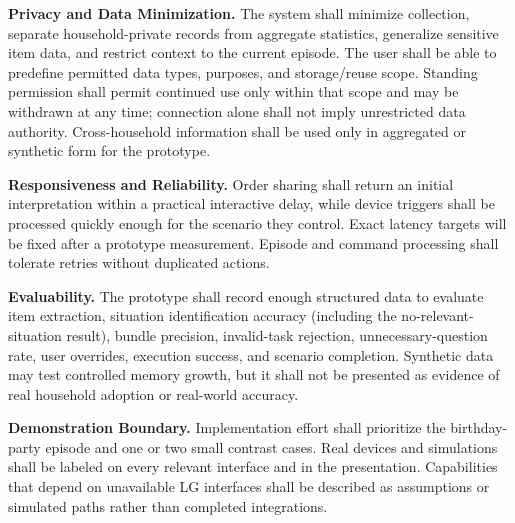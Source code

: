 \documentclass[conference]{IEEEtran}
\newcommand{\req}[1]{\par\addvspace{3pt}\noindent\textbf{#1}}
\begin{document}
\req{Privacy and Data Minimization.}
The system shall minimize collection, separate household-private records from aggregate statistics, generalize sensitive item data, and restrict context to the current episode. The user shall be able to predefine permitted data types, purposes, and storage/reuse scope. Standing permission shall permit continued use only within that scope and may be withdrawn at any time; connection alone shall not imply unrestricted data authority. Cross-household information shall be used only in aggregated or synthetic form for the prototype.

\req{Responsiveness and Reliability.}
Order sharing shall return an initial interpretation within a practical interactive delay, while device triggers shall be processed quickly enough for the scenario they control. Exact latency targets will be fixed after a prototype measurement. Episode and command processing shall tolerate retries without duplicated actions.

\req{Evaluability.}
The prototype shall record enough structured data to evaluate item extraction, situation identification accuracy (including the no-relevant-situation result), bundle precision, invalid-task rejection, unnecessary-question rate, user overrides, execution success, and scenario completion. Synthetic data may test controlled memory growth, but it shall not be presented as evidence of real household adoption or real-world accuracy.

\req{Demonstration Boundary.}
Implementation effort shall prioritize the birthday-party episode and one or two small contrast cases. Real devices and simulations shall be labeled on every relevant interface and in the presentation. Capabilities that depend on unavailable LG interfaces shall be described as assumptions or simulated paths rather than completed integrations.
\end{document}
